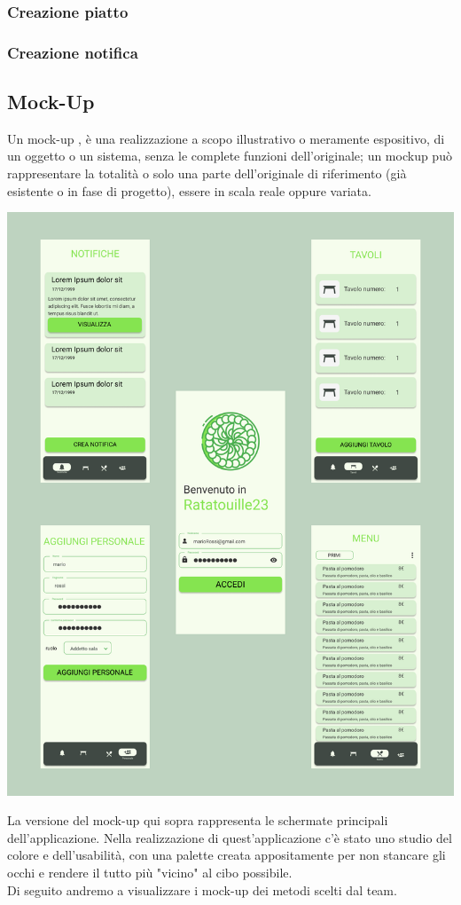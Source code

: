 \subsubsection{Creazione piatto}

\subsubsection{Creazione notifica}
\newpage
\subsection{Mock-Up}
Un mock-up , è una realizzazione a scopo illustrativo o meramente espositivo, di un oggetto o un sistema, senza le complete funzioni
dell'originale; un mockup può rappresentare la totalità o solo una parte dell'originale di riferimento (già esistente o in fase di progetto), essere in scala
reale oppure variata.
\begin{center}
  \includegraphics[scale=0.2]{img/Mock-up.doc}
\end{center}
La versione del mock-up qui sopra rappresenta le schermate principali dell'applicazione. Nella realizzazione di quest'applicazione c'è stato uno studio del colore e dell'usabilità, con una palette creata appositamente per non stancare gli occhi e rendere il tutto più "vicino" al cibo possibile.\\
Di seguito andremo a visualizzare i mock-up dei metodi scelti dal team.
\newpage
